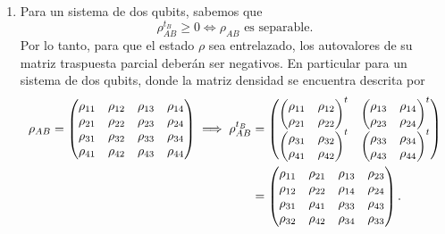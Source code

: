 \documentclass{scrartcl}
\DeclareRobustCommand{\[}{\begin{equation}}
\DeclareRobustCommand{\]}{\end{equation}}
\begin{document}
\begin{enumerate}
\begin{enumerate}
        
        \item Para un sistema de dos qubits, sabemos que
        \[ \rho_{AB}^{t_B} \geq 0 \iff \rho_{AB} \text{ es separable}. \]
        Por lo tanto, para que el estado $\rho$ sea entrelazado, los autovalores de su matriz traspuesta parcial deberán ser negativos.
        En particular para un sistema de dos qubits, donde la matriz densidad se encuentra descrita por
        \begin{align}
            \rho_{AB} = \begin{pmatrix} \mqty{\xmat*{\rho}{4}{4}} \end{pmatrix} \implies \rho^{t_B}_{AB} &=
            \begin{pmatrix}
                \begin{pmatrix} \rho_{11} & \rho_{12} \\ \rho_{21} & \rho_{22} \end{pmatrix}^t & \begin{pmatrix} \rho_{13} & \rho_{14} \\ \rho_{23} & \rho_{24} \end{pmatrix}^t \\
                \begin{pmatrix} \rho_{31} & \rho_{32} \\ \rho_{41} & \rho_{42} \end{pmatrix}^t & \begin{pmatrix} \rho_{33} & \rho_{34} \\ \rho_{43} & \rho_{44} \end{pmatrix}^t \\
            \end{pmatrix} \\
            &=
            \begin{pmatrix}
                \rho_{11} & \rho_{21} & \rho_{13} & \rho_{23} \\
                \rho_{12} & \rho_{22} & \rho_{14} & \rho_{24} \\
                \rho_{31} & \rho_{41} & \rho_{33} & \rho_{43} \\
                \rho_{32} & \rho_{42} & \rho_{34} & \rho_{33} \\
            \end{pmatrix}.
        \end{align}
        

\end{enumerate}
\end{enumerate}
\end{document}
